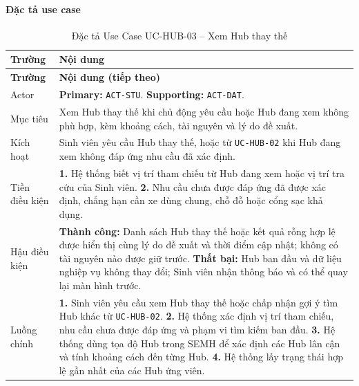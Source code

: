 \paragraph{Đặc tả use case}
\small
\begin{longtable}{|L{26mm}|L{118mm}|}
  \caption{Đặc tả Use Case UC-HUB-03 -- Xem Hub thay thế}\label{tab:spec-UC-HUB-03}\\
  \hline
  \centering\arraybackslash\textbf{Trường} & \centering\arraybackslash\textbf{Nội dung}\\
  \hline
  \endfirsthead
  \hline
  \centering\arraybackslash\textbf{Trường} & \centering\arraybackslash\textbf{Nội dung (tiếp theo)}\\
  \hline
  \endhead
  Actor & \textbf{Primary:} \texttt{ACT-STU}. \textbf{Supporting:} \texttt{ACT-DAT}.\\\hline
  Mục tiêu & Xem Hub thay thế khi chủ động yêu cầu hoặc Hub đang xem không phù hợp, kèm khoảng cách, tài nguyên và lý do đề xuất.\\\hline
  Kích hoạt & Sinh viên yêu cầu Hub thay thế, hoặc từ \texttt{UC-HUB-02} khi Hub đang xem không đáp ứng nhu cầu đã xác định.\\\hline
  Tiền điều kiện &
    \textbf{1.} Hệ thống biết vị trí tham chiếu từ Hub đang xem hoặc vị trí tra cứu của Sinh viên.\newline
    \textbf{2.} Nhu cầu chưa được đáp ứng đã được xác định, chẳng hạn cần xe dùng chung, chỗ đỗ hoặc cổng sạc khả dụng.\\\hline
  Hậu điều kiện &
    \textbf{Thành công:} Danh sách Hub thay thế hoặc kết quả rỗng hợp lệ được hiển thị cùng lý do đề xuất và thời điểm cập nhật; không có tài nguyên nào được giữ trước.\newline
    \textbf{Thất bại:} Hub ban đầu và dữ liệu nghiệp vụ không thay đổi; Sinh viên nhận thông báo và có thể quay lại màn hình trước.\\\hline
  Luồng chính &
    \textbf{1.} Sinh viên yêu cầu xem Hub thay thế hoặc chấp nhận gợi ý tìm Hub khác từ \texttt{UC-HUB-02}.\newline
    \textbf{2.} Hệ thống xác định vị trí tham chiếu, nhu cầu chưa được đáp ứng và phạm vi tìm kiếm ban đầu.\newline
    \textbf{3.} Hệ thống dùng tọa độ Hub trong SEMH để xác định các Hub lân cận và tính khoảng cách đến từng Hub.\newline
    \textbf{4.} Hệ thống lấy trạng thái hợp lệ gần nhất của các Hub ứng viên.\newline

\end{longtable}
